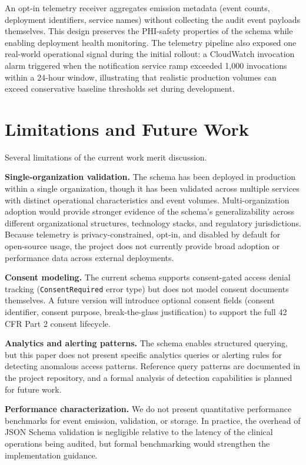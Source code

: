 \documentclass[11pt,a4paper]{article}
\begin{document}
An opt-in telemetry receiver aggregates emission metadata (event counts, deployment identifiers, service names) without collecting the audit event payloads themselves. This design preserves the PHI-safety properties of the schema while enabling deployment health monitoring. The telemetry pipeline also exposed one real-world operational signal during the initial rollout: a CloudWatch invocation alarm triggered when the notification service ramp exceeded 1,000 invocations within a 24-hour window, illustrating that realistic production volumes can exceed conservative baseline thresholds set during development.

\section{Limitations and Future Work}

Several limitations of the current work merit discussion.

\textbf{Single-organization validation.} The schema has been deployed in production within a single organization, though it has been validated across multiple services with distinct operational characteristics and event volumes. Multi-organization adoption would provide stronger evidence of the schema's generalizability across different organizational structures, technology stacks, and regulatory jurisdictions. Because telemetry is privacy-constrained, opt-in, and disabled by default for open-source usage, the project does not currently provide broad adoption or performance data across external deployments.

\textbf{Consent modeling.} The current schema supports consent-gated access denial tracking (\texttt{ConsentRequired} error type) but does not model consent documents themselves. A future version will introduce optional consent fields (consent identifier, consent purpose, break-the-glass justification) to support the full 42 CFR Part 2 consent lifecycle.

\textbf{Analytics and alerting patterns.} The schema enables structured querying, but this paper does not present specific analytics queries or alerting rules for detecting anomalous access patterns. Reference query patterns are documented in the project repository, and a formal analysis of detection capabilities is planned for future work.

\textbf{Performance characterization.} We do not present quantitative performance benchmarks for event emission, validation, or storage. In practice, the overhead of JSON Schema validation is negligible relative to the latency of the clinical operations being audited, but formal benchmarking would strengthen the implementation guidance.
\end{document}

